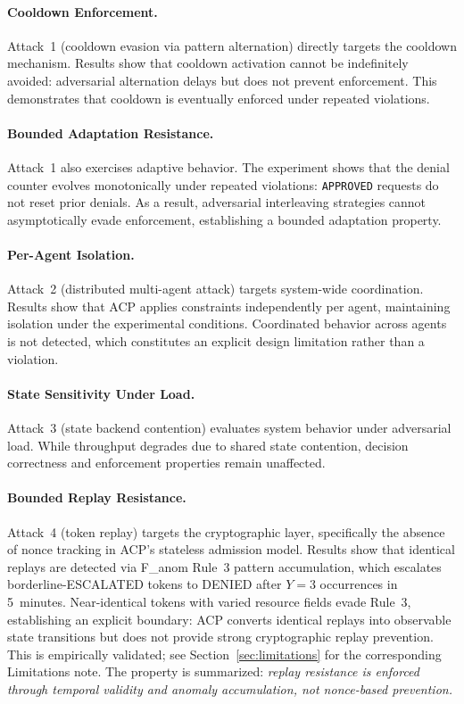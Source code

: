 \documentclass[11pt]{article}
\theoremstyle{definition}
\begin{document}
\paragraph{Cooldown Enforcement.}
Attack~1 (cooldown evasion via pattern alternation) directly targets the cooldown
mechanism. Results show that cooldown activation cannot be indefinitely avoided:
adversarial alternation delays but does not prevent enforcement. This demonstrates
that cooldown is eventually enforced under repeated violations.

\paragraph{Bounded Adaptation Resistance.}
Attack~1 also exercises adaptive behavior. The experiment shows that the denial
counter evolves monotonically under repeated violations: \texttt{APPROVED} requests
do not reset prior denials. As a result, adversarial interleaving strategies cannot
asymptotically evade enforcement, establishing a bounded adaptation property.

\paragraph{Per-Agent Isolation.}
Attack~2 (distributed multi-agent attack) targets system-wide coordination. Results
show that ACP applies constraints independently per agent, maintaining isolation
under the experimental conditions.
Coordinated behavior across agents is not detected, which constitutes an
explicit design limitation rather than a violation.

\paragraph{State Sensitivity Under Load.}
Attack~3 (state backend contention) evaluates system behavior under adversarial load.
While throughput degrades due to shared state contention, decision correctness and
enforcement properties remain unaffected.

\paragraph{Bounded Replay Resistance.}
Attack~4 (token replay) targets the cryptographic layer, specifically the absence
of nonce tracking in ACP's stateless admission model.
Results show that identical replays are detected via F\_anom Rule~3 pattern
accumulation, which escalates borderline-ESCALATED tokens to DENIED after $Y=3$
occurrences in 5~minutes.
Near-identical tokens with varied resource fields evade Rule~3, establishing an
explicit boundary: ACP converts identical replays into observable state transitions
but does not provide strong cryptographic replay prevention.
This is empirically validated; see Section~\ref{sec:limitations} for the
corresponding Limitations note.
The property is summarized: \emph{replay resistance is enforced through temporal
validity and anomaly accumulation, not nonce-based prevention.}
\end{document}
